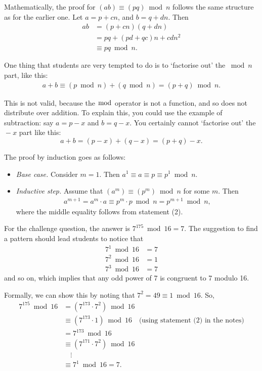 \documentclass[12pt]{article}
\begin{document}
Mathematically, the proof for $(ab) \equiv (pq) \bmod n$ follows the same structure as for the earlier one.
Let $a = p + cn$, and $b = q + dn$. Then
\begin{align*}
    ab &= (p + cn)(q + dn) \\
       &= pq + (pd + qc)n + cdn^2 \\
       &\equiv pq \bmod n.
\end{align*}

One thing that students are very tempted to do is to `factorise out' the ${} \bmod n$ part, like this:
\begin{align*}
    a + b \equiv (p \bmod n) + (q \bmod n) = (p + q) \bmod n.
\end{align*}

This is not valid, because the $\bmod$ operator is not a function, and so does not distribute over addition.
To explain this, you could use the example of subtraction: say $a = p - x$ and $b = q - x$.
You certainly cannot `factorise out' the ${}-x$ part like this:
\begin{equation*}
a + b = (p - x) + (q - x) = (p + q) - x.
\end{equation*}

The proof by induction goes as follows:

\begin{itemize}
    \item \textit{Base case.} Consider $m = 1$. Then $a^1 \equiv a \equiv p \equiv p^1 \bmod n$.
    \item \textit{Inductive step.} Assume that $(a^m) \equiv (p^m) \bmod n$ for some $m$. Then
        \begin{align*}
            a^{m+1} = a^m \cdot a \equiv p^m \cdot p \bmod n = p^{m+1} \bmod n,
        \end{align*}
        where the middle equality follows from statement (2).
\end{itemize}

For the challenge question, the answer is $7^{175} \bmod 16 = 7$.
The suggestion to find a pattern should lead students to notice that
\begin{align*}
    7^1 \bmod 16 &= 7 \\
    7^2 \bmod 16 &= 1 \\
    7^3 \bmod 16 &= 7
\end{align*}
and so on, which implies that any odd power of 7 is congruent to 7 modulo 16.

Formally, we can show this by noting that $7^2 = 49 \equiv 1 \bmod 16$. So,
\begin{align*}
    7^{175} \bmod 16 &= (7^{173} \cdot 7^2) \bmod 16 \\
                     &\equiv (7^{173} \cdot 1) \bmod 16 \quad \text{(using statement (2) in the notes)} \\
                     &= 7^{173} \bmod 16 \\
                     &\equiv (7^{171} \cdot 7^2) \bmod 16 \\
                     &\quad\vdots \\
                     &\equiv 7^1 \bmod 16 = 7.\\
\end{align*}
\end{document}
